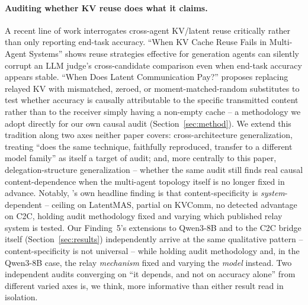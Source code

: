 \documentclass[11pt]{article}
\begin{document}
\paragraph{Auditing whether KV reuse does what it claims.} A recent line
of work interrogates cross-agent KV/latent reuse critically rather than
only reporting end-task accuracy. ``When KV Cache Reuse Fails in
Multi-Agent Systems'' \citep{kvreusefails2026} shows reuse strategies
effective for generation agents can silently corrupt an LLM judge's
cross-candidate comparison even when end-task accuracy appears stable.
``When Does Latent Communication Pay?'' \citep{latentcommpay2026} proposes
replacing relayed KV with mismatched, zeroed, or moment-matched-random
substitutes to test whether accuracy is causally attributable to the
specific transmitted content rather than to the receiver simply having a
non-empty cache -- a methodology we adopt directly for our own causal
audit (Section~\ref{sec:method}). We extend this tradition along two axes
neither paper covers: cross-architecture generalization, treating ``does
the same technique, faithfully reproduced, transfer to a different model
family'' as itself a target of audit; and, more centrally to this paper,
delegation-structure generalization -- whether the same audit still
finds real causal content-dependence when the multi-agent topology
itself is no longer fixed in advance. Notably, \citet{latentcommpay2026}'s
own headline finding is that content-specificity is \emph{system}-dependent
-- ceiling on LatentMAS, partial on KVComm, no detected advantage on C2C,
holding audit methodology fixed and varying which published relay system
is tested. Our Finding~5's extensions to Qwen3-8B and to the C2C bridge
itself (Section~\ref{sec:results}) independently arrive at the same
qualitative pattern -- content-specificity is not universal -- while
holding audit methodology and, in the Qwen3-8B case, the relay
\emph{mechanism} fixed and varying the \emph{model} instead. Two
independent audits converging on ``it depends, and not on accuracy
alone'' from different varied axes is, we think, more informative than
either result read in isolation.
\end{document}
